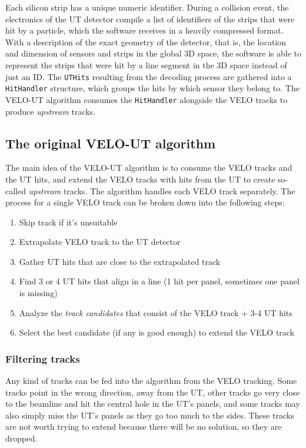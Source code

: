 \documentclass[12pt]{article}
\newcommand{\code}[1]{\texttt{#1}}
\begin{document}
Each silicon strip has a unique numeric identifier. During a collision event, the electronics of the UT detector compile a list of identifiers of the strips that were hit by a particle, which the software receives in a heavily compressed format. With a description of the exact geometry of the detector, that is, the location and dimension of sensors and strips in the global 3D space, the software is able to represent the strips that were hit by a line segment in the 3D space instead of just an ID. The \code{UTHits} resulting from the decoding process are gathered into a \code{HitHandler} structure, which groups the hits by which sensor they belong to. The VELO-UT algorithm consumes the \code{HitHandler} alongside the VELO tracks to produce \textit{upstream} tracks.


\subsection{The original VELO-UT algorithm}\label{sec_velout_desc}

The main idea of the VELO-UT algorithm is to consume the VELO tracks and the UT hits, and extend the VELO tracks with hits from the UT to create so-called \textit{upstream} tracks. The algorithm handles each VELO track separately. The process for a single VELO track can be broken down into the following steps:

\begin{enumerate}
	\item Skip track if it's unsuitable
	\item Extrapolate VELO track to the UT detector
	\item Gather UT hits that are close to the extrapolated track
	\item Find 3 or 4 UT hits that align in a line (1 hit per panel, sometimes one panel is missing)
	\item Analyze the \textit{track candidates} that consist of the VELO track + 3-4 UT hits
	\item Select the best candidate (if any is good enough) to extend the VELO track
\end{enumerate}


\subsubsection{Filtering tracks}

Any kind of tracks can be fed into the algorithm from the VELO tracking. Some tracks point in the wrong direction, away from the UT, other tracks go very close to the beamline and hit the central hole in the UT's panels, and some tracks may also simply miss the UT's panels as they go too much to the sides. These tracks are not worth trying to extend because there will be no solution, so they are dropped.
\end{document}

